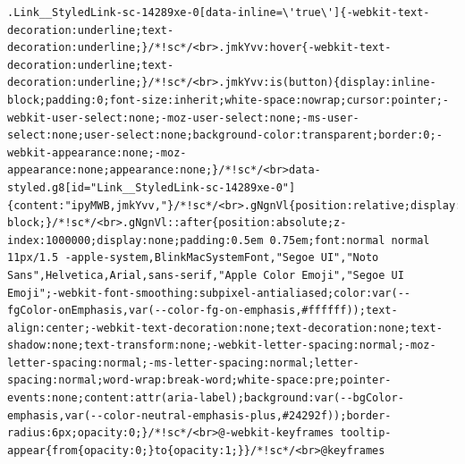 \documentclass[
  letterpaper,
]{book}
\begin{document}
\begin{verbatim}
.Link__StyledLink-sc-14289xe-0[data-inline=\'true\']{-webkit-text-decoration:underline;text-decoration:underline;}/*!sc*/<br>.jmkYvv:hover{-webkit-text-decoration:underline;text-decoration:underline;}/*!sc*/<br>.jmkYvv:is(button){display:inline-block;padding:0;font-size:inherit;white-space:nowrap;cursor:pointer;-webkit-user-select:none;-moz-user-select:none;-ms-user-select:none;user-select:none;background-color:transparent;border:0;-webkit-appearance:none;-moz-appearance:none;appearance:none;}/*!sc*/<br>data-styled.g8[id="Link__StyledLink-sc-14289xe-0"]{content:"ipyMWB,jmkYvv,"}/*!sc*/<br>.gNgnVl{position:relative;display:inline-block;}/*!sc*/<br>.gNgnVl::after{position:absolute;z-index:1000000;display:none;padding:0.5em 0.75em;font:normal normal 11px/1.5 -apple-system,BlinkMacSystemFont,"Segoe UI","Noto Sans",Helvetica,Arial,sans-serif,"Apple Color Emoji","Segoe UI Emoji";-webkit-font-smoothing:subpixel-antialiased;color:var(--fgColor-onEmphasis,var(--color-fg-on-emphasis,#ffffff));text-align:center;-webkit-text-decoration:none;text-decoration:none;text-shadow:none;text-transform:none;-webkit-letter-spacing:normal;-moz-letter-spacing:normal;-ms-letter-spacing:normal;letter-spacing:normal;word-wrap:break-word;white-space:pre;pointer-events:none;content:attr(aria-label);background:var(--bgColor-emphasis,var(--color-neutral-emphasis-plus,#24292f));border-radius:6px;opacity:0;}/*!sc*/<br>@-webkit-keyframes tooltip-appear{from{opacity:0;}to{opacity:1;}}/*!sc*/<br>@keyframes 
\end{verbatim}
\end{document}
